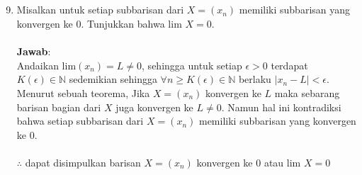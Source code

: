 \documentclass[10pt,openany,a4paper]{article}
\begin{document}
    \subsection{}
    \begin{enumerate}
        \setcounter{enumi}{8}
        \item Misalkan untuk setiap subbarisan dari $X=(x_n)$ memiliki subbarisan yang konvergen ke $0$. Tunjukkan bahwa lim $X=0$.\\~\\
        \textbf{Jawab}:\\
        Andaikan lim$(x_n)=L\neq0$, sehingga untuk setiap $\epsilon>0$ terdapat $K(\epsilon)\in\mathbb{N}$ sedemikian sehingga $\forall n\geq K(\epsilon)\in\mathbb{N}$ berlaku $|x_n-L|<\epsilon$.\\
        Menurut sebuah teorema, Jika $X=(x_n)$ konvergen ke $L$ maka sebarang barisan bagian dari $X$ juga konvergen ke $L\neq0$. Namun hal ini kontradiksi bahwa setiap subbarisan dari $X=(x_n)$ memiliki subbarisan yang konvergen ke $0$.\\~\\
        $\therefore$ dapat disimpulkan barisan $X=(x_n)$ konvergen ke $0$ atau lim $X=0$
    \end{enumerate}
\end{document}
